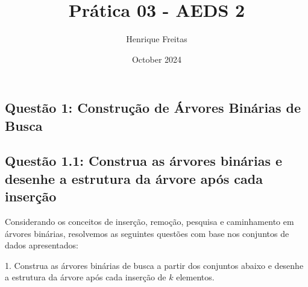 \documentclass{article}
\title{Prática 03 - AEDS 2}
\author{Henrique Freitas}
\date{October 2024}
\begin{document}
\maketitle

\begin{center}
\section{Questão 1: Construção de Árvores Binárias de Busca}
\subsection{Questão 1.1:  Construa as árvores binárias e desenhe a estrutura da árvore após cada inserção}
\end{center}
Considerando os conceitos de inserção, remoção, pesquisa e caminhamento em árvores binárias, resolvemos as seguintes questões com base nos conjuntos de dados apresentados:

1. Construa as árvores binárias de busca a partir dos conjuntos abaixo e desenhe a estrutura da árvore após cada inserção de \(k\) elementos.
\end{document}
